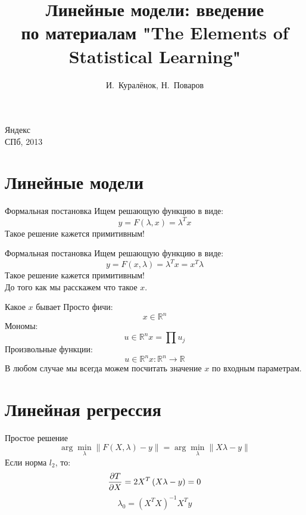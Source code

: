 \documentclass[14pt, fleqn, xcolor={dvipsnames, table}]{beamer}
\title{Линейные модели: введение\\\small{по материалам "The Elements of Statistical Learning"}}
\author[]{\small{%
И.~Куралёнок,
Н.~Поваров}}
\date{}
\begin{document}
\begin{frame}
\maketitle
\small
\begin{center}
\vspace{-60pt}
\normalsize {\color{red}Я}ндекс \\
\vspace{80pt}
\footnotesize СПб, 2013
\end{center}
\end{frame}

\section{Линейные модели}
\begin{frame}{Формальная постановка}
Ищем решающую функцию в виде:
$$
y = F(\lambda, x) = \lambda^T x
$$
Такое решение кажется примитивным!
\end{frame}
\begin{frame}{Формальная постановка}
Ищем решающую функцию в виде:
$$
y = F(x, \lambda) = \lambda^T x = x^T \lambda
$$
Такое решение кажется примитивным! \\
До того как мы расскажем что такое $x$.
\end{frame}
\begin{frame}{Какое $x$ бывает}
Просто фичи:
$$
x \in \mathbb{R}^n
$$
Мономы:
$$
u \in \mathbb{R}^n
x = \prod u_j
$$
Произвольные функции:
$$
u \in \mathbb{R}^n
x: \mathbb{R}^n \to \mathbb{R}
$$
В любом случае мы всегда можем посчитать значение $x$ по входным параметрам.
\end{frame}

\section{Линейная регрессия}
\begin{frame}{Простое решение}
$$
\arg \min_{\lambda} \|F(X, \lambda) - y\| = \arg \min_{\lambda} \|X \lambda - y\|
$$
Если норма $l_2$, то:
$$
{\partial T \over \partial X} = 2 X^T\left(X\lambda - y\right) = 0
$$
$$
\lambda_0 = (X^TX)^{-1}X^Ty
$$
\end{frame}
\end{document}
